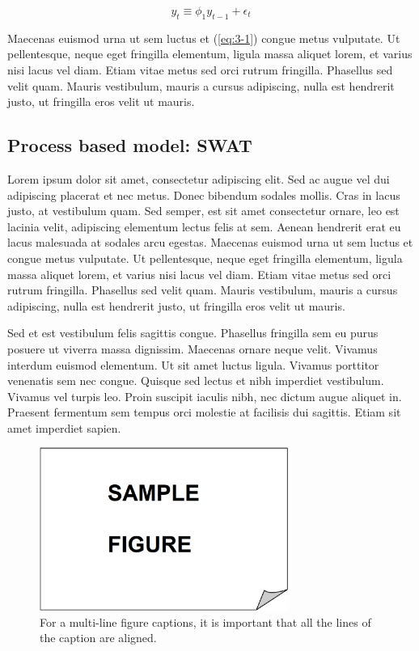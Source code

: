 \begin{equation}
\label{eq:3-1}
   y_{t}  \equiv \phi_{1} y_{t-1} + \epsilon_{t}
\end{equation}

Maecenas euismod urna ut sem luctus et (\ref{eq:3-1})
congue metus vulputate. Ut pellentesque, neque eget fringilla elementum, ligula 
massa aliquet lorem, et varius nisi lacus vel diam. Etiam vitae metus sed orci 
rutrum fringilla. Phasellus sed velit quam. Mauris vestibulum, mauris a cursus 
adipiscing, nulla est hendrerit justo, ut fringilla eros velit ut mauris.

\subsection{Process based model: SWAT}

Lorem ipsum dolor sit amet, consectetur adipiscing elit. Sed ac augue vel dui 
adipiscing placerat et nec metus. Donec bibendum sodales mollis. Cras in lacus 
justo, at vestibulum quam. Sed semper, est sit amet consectetur ornare, leo est 
lacinia velit, adipiscing elementum lectus felis at sem. Aenean hendrerit erat eu 
lacus malesuada at sodales arcu egestas. Maecenas euismod urna ut sem luctus et 
congue metus vulputate. Ut pellentesque, neque eget fringilla elementum, ligula 
massa aliquet lorem, et varius nisi lacus vel diam. Etiam vitae metus sed orci 
rutrum fringilla. Phasellus sed velit quam. Mauris vestibulum, mauris a cursus 
adipiscing, nulla est hendrerit justo, ut fringilla eros velit ut mauris.

Sed et est vestibulum felis sagittis congue. Phasellus fringilla sem eu purus 
posuere ut viverra massa dignissim. Maecenas ornare neque velit. Vivamus interdum 
euismod elementum. Ut sit amet luctus ligula. Vivamus porttitor venenatis sem nec 
congue. Quisque sed lectus et nibh imperdiet vestibulum. Vivamus vel turpis leo. 
Proin suscipit iaculis nibh, nec dictum augue aliquet in. Praesent fermentum sem 
tempus orci molestie at facilisis dui sagittis. Etiam sit amet imperdiet sapien.

\begin{figure}[h!]
 \centering
 \includegraphics[width=230pt,keepaspectratio=true]{./fig/sekil3}
 \vspace{4mm}
 \caption{For a multi-line figure captions, it is important that all the
  lines of the caption are aligned.}
 \label{fig:3-1-3}
\end{figure}

